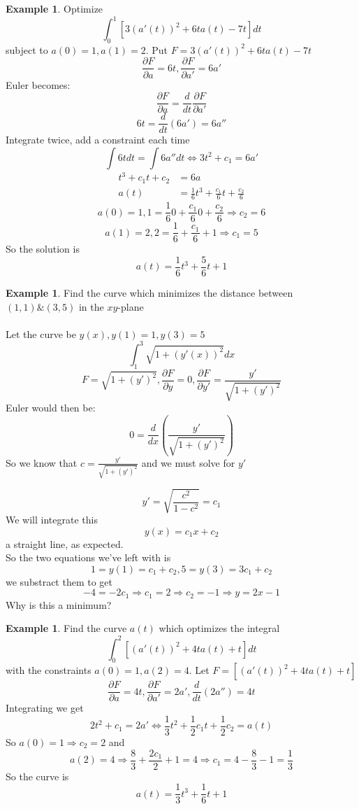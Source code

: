 \documentclass[12pt]{article}
\theoremstyle{plain}
\theoremstyle{definition}
\newtheorem{example}[theorem]{Example}
\begin{document}
\begin{example}
	Optimize
	$$\int^1_0 [3(a'(t))^2 + 6t a(t) - 7t]dt$$
	subject to $a(0)=1, a(1)=2$. Put $F = 3(a'(t))^2 + 6t a(t) - 7t$
	$$\frac{\partial F}{\partial a} = 6t, \frac{\partial F}{\partial a'} = 6a'$$
	Euler becomes:
	$$\frac{\partial F}{\partial a} = \frac{d}{dt} \frac{\partial F}{\partial a'}$$
	$$6t = \frac{d}{dt} (6a') = 6a''$$
	Integrate twice, add a constraint each time
	$$\int 6tdt = \int 6a''dt \Longleftrightarrow 3t^2+c_1 = 6a'$$
	\begin{align*}
		t^3 + c_1 t + c_2 &= 6a\\
		a(t) &= \frac{1}{6}t^3 + \frac{c_1}{6}t + \frac{c_2}{6}
	\end{align*}
	$$a(0)=1, 1 = \frac{1}{6}0 + \frac{c_1}{6}0 + \frac{c_2}{6} \Longrightarrow c_2 = 6$$
	$$a(1)=2, 2 = \frac{1}{6} + \frac{c_1}{6} + 1 \Longrightarrow c_1 = 5$$
	So the solution is
	$$a(t)=\frac{1}{6} t^3 + \frac{5}{6} t + 1$$
\end{example}

\begin{example}
	Find the curve which minimizes the distance between $(1,1) \& (3,5)$ in the $xy$-plane\\
	\\
	Let the curve be $y(x), y(1)=1, y(3)=5$
	$$\int^3_1 \sqrt{1+ (y'(x))^2} dx$$
	$$F = \sqrt{1+ (y')^2}, \frac{\partial F}{\partial y} = 0, \frac{\partial F}{\partial y'} = \frac{y'}{\sqrt{1+ (y')^2}}$$
	Euler would then be:
	$$0 = \frac{d}{dx} (\frac{y'}{\sqrt{1+ (y')^2}})$$
	So we know that $c=\frac{y'}{\sqrt{1+ (y')^2}}$ and we must solve for $y'$

	$$y' = \sqrt{\frac{c^2}{1-c^2}} = c_1$$
	We will integrate this
	$$y(x) = c_1 x + c_2$$
	a straight line, as expected.\\
	So the two equations we've left with is
	$$1=y(1)=c_1 + c_2, 5 = y(3)=3c_1 + c_2$$
	we substract them to get
	$$-4 = -2c_1 \Longrightarrow c_1 = 2 \Longrightarrow c_2 = -1 \Longrightarrow y = 2x-1$$
	Why is this a minimum?
\end{example}

\begin{example}
	Find the curve $a(t)$ which optimizes the integral
	$$\int^2_0 [(a'(t))^2+4ta(t)+t]dt$$
	with the constraints $a(0)=1, a(2)=4$. Let $F = [(a'(t))^2+4ta(t)+t]$
	$$\frac{\partial F}{\partial a} = 4t, \frac{\partial F}{\partial a'} = 2a', \frac{d}{dt} (2a'') = 4t$$
	Integrating we get
	$$2t^2 + c_1 = 2a' \Longleftrightarrow \frac{1}{3}t^2 + \frac{1}{2} c_1 t + \frac{1}{2}c_2 = a(t)$$
	So $a(0)=1 \Longrightarrow c_2 = 2$ and $$a(2)=4 \Longrightarrow \frac{8}{3} + \frac{2c_1}{2} + 1 = 4 \Longrightarrow c_1 = 4 - \frac{8}{3} - 1 = \frac{1}{3}$$
	So the curve is
	$$a(t) = \frac{1}{3}t^3 + \frac{1}{6} t + 1$$
\end{example}
\end{document}
